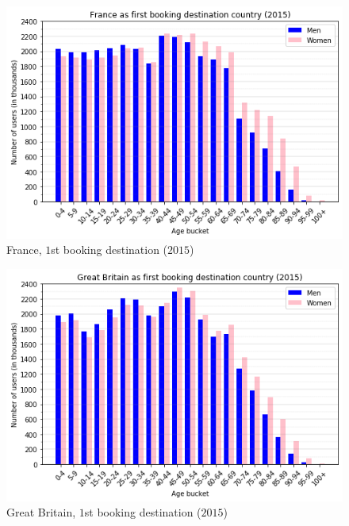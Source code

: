 \documentclass[twocolumn, switch]{article}
\begin{document}
\begin{figure}[H]
\centering
\includegraphics[scale=0.35]{../graphs/age_gender_bkts_FR}
\caption{France, $1$st booking destination ($2015$)}
\label{fig:france}
\end{figure}

\begin{figure}[H]
\centering
\includegraphics[scale=0.35]{../graphs/age_gender_bkts_GB}
\caption{Great Britain, $1$st booking destination ($2015$)}
\label{fig:greatbritain}
\end{figure}
\end{document}
